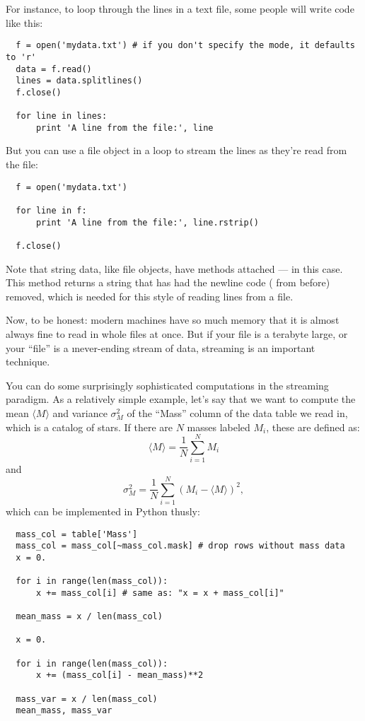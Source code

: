 \documentclass[letterpaper, 12pt, titlepage, twoside]{article}
\begin{document}
For instance, to loop through the lines in a text file, some people will write
code like this:

\begin{lstlisting}
  f = open('mydata.txt') # if you don't specify the mode, it defaults to 'r'
  data = f.read()
  lines = data.splitlines()
  f.close()

  for line in lines:
      print 'A line from the file:', line
\end{lstlisting}

But you can use a file object in a  loop to stream the lines as they're
read from the file:

\begin{lstlisting}
  f = open('mydata.txt')

  for line in f:
      print 'A line from the file:', line.rstrip()

  f.close()
\end{lstlisting}

Note that string data, like file objects, have methods attached ---
 in this case. This method returns a string that has had the
newline code ( from before) removed, which is needed for
this style of reading lines from a file.

Now, to be honest: modern machines have so much memory that it is almost
always fine to read in whole files at once. But if your file is a terabyte
large, or your ``file'' is a \i{never-ending} stream of data, streaming is an
important technique.

You can do some surprisingly sophisticated computations in the streaming
paradigm. As a relatively simple example, let's say that we want to compute
the mean $\langle M\rangle$ and variance $\sigma^2_M$ of the ``Mass'' column
of the data table we read in, which is a catalog of stars. If there are $N$
masses labeled $M_i$, these are defined as:
\[
\langle M\rangle = \frac{1}{N} \sum_{i = 1}^N M_i
\]
and
\[
\sigma^2_M = \frac{1}{N} \sum_{i = 1}^N (M_i - \langle M\rangle)^2,
\]
which can be implemented in Python thusly:

\begin{lstlisting}
  mass_col = table['Mass']
  mass_col = mass_col[~mass_col.mask] # drop rows without mass data
  x = 0.

  for i in range(len(mass_col)):
      x += mass_col[i] # same as: "x = x + mass_col[i]"

  mean_mass = x / len(mass_col)

  x = 0.

  for i in range(len(mass_col)):
      x += (mass_col[i] - mean_mass)**2

  mass_var = x / len(mass_col)
  mean_mass, mass_var
\end{lstlisting}
\end{document}

